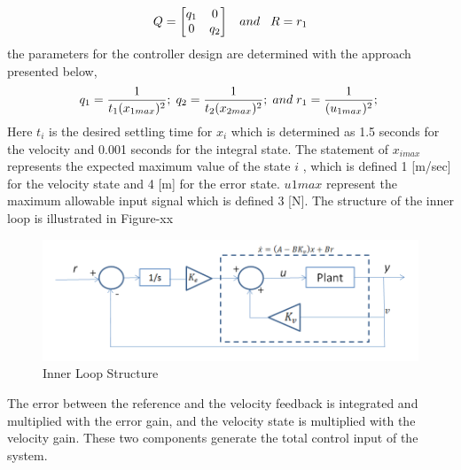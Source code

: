 \documentclass[twoside]{article}
\begin{document}
\begin{equation}
 Q = \begin{bmatrix}
q_1 & 0 \\ 0 & q_2
 \end{bmatrix}
 \hspace{0.3cm} and
\hspace{0.3cm}
 R = r_1
\end{equation}
the parameters for the controller design are determined with the approach presented below,
\begin{equation}
q_1 = \frac{1}{t_1 (x_{1max})^2}; \hspace{0.1cm}
q_2 = \frac{1}{t_2 (x_{2max})^2}; \hspace{0.1cm} and \hspace{0.1cm}
r_1 = \frac{1}{ (u_{1max})^2}; \hspace{0.1cm}
\end{equation}
Here $t_i$  is the desired settling time for $x_i$ which is determined as 1.5 seconds for the velocity and 0.001 seconds for the integral state. The statement of $x_{imax}$ represents the expected maximum value of the state $i$ , which is defined 1 [m/sec] for the velocity state and 4 [m] for the error state. $u{1max}$ represent the maximum allowable input signal which is defined 3 [N]. The structure of the inner loop is illustrated in Figure-xx
	\begin{figure}[H]
		\caption{Inner Loop Structure}
		\centering
		\includegraphics[scale = 0.50]{inner_loop}
	\end{figure}



The error between the reference and the velocity feedback is integrated and multiplied with the error gain, and the velocity state is multiplied with the velocity gain. These two components generate the total control input of the system.  
\end{document}
